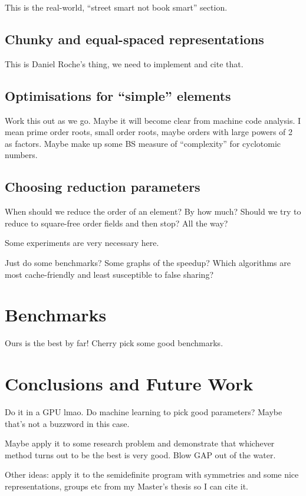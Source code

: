 \documentclass{article}
\begin{document}
This is the real-world, ``street smart not book smart'' section.

\subsection{Chunky and equal-spaced representations}

This is Daniel Roche's thing, we need to implement and cite that.

\subsection{Optimisations for ``simple'' elements}

Work this out as we go. Maybe it will become clear from machine code
analysis. I mean prime order roots, small order roots, maybe orders
with large powers of 2 as factors. Maybe make up some BS measure of
``complexity'' for cyclotomic numbers.

\subsection{Choosing reduction parameters}

When should we reduce the order of an element? By how much? Should we
try to reduce to square-free order fields and then stop? All the way?

Some experiments are very necessary here.

Just do some benchmarks? Some graphs of the speedup? Which algorithms
are most cache-friendly and least susceptible to false sharing?

\section{Benchmarks}

Ours is the best by far! Cherry pick some good benchmarks.

\section{Conclusions and Future Work}

Do it in a GPU lmao. Do machine learning to pick good parameters?
Maybe that's not a buzzword in this case.

Maybe apply it to some research problem and demonstrate that whichever
method turns out to be the best is very good. Blow GAP out of the
water.

Other ideas: apply it to the semidefinite program with symmetries and
some nice representations, groups etc from my Master's thesis so I can
cite it.
\end{document}
